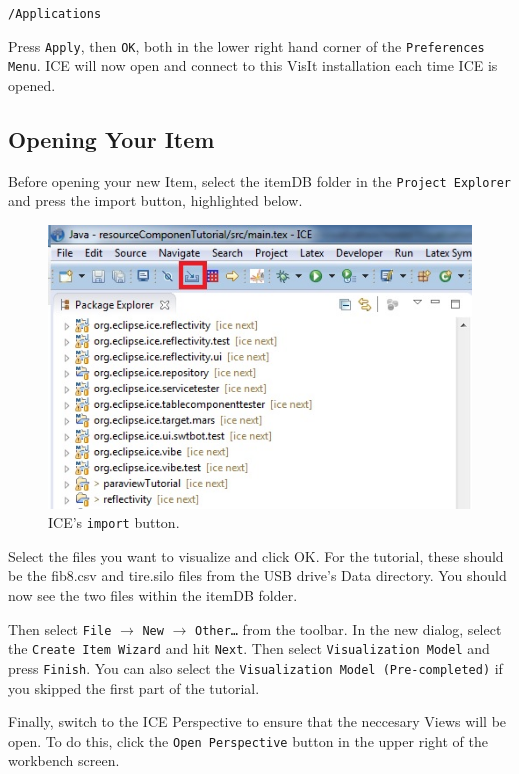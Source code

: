 \texttt{/Applications}

Press \texttt{Apply}, then \texttt{OK}, both in the lower right hand corner of
the \texttt{Preferences Menu}.
ICE will now open and connect to this VisIt installation each time ICE is opened.

\subsection{Opening Your Item}
Before opening your new Item, select the itemDB folder in the \texttt{Project
Explorer} and press the import button, highlighted below.

\begin{figure}[!h]
\includegraphics[width=12cm]{images/ImportButton}
\centering
\caption{ICE's \texttt{import} button.}
\label{fig:importbutton}
\end{figure}

Select the files you want to visualize and click OK. For the tutorial, these
should be the fib8.csv and tire.silo files from the USB drive's Data directory.
You should now see the two files within the itemDB folder.

Then select \texttt{File} $\rightarrow$ \texttt{New} $\rightarrow$
\texttt{Other\ldots} from the toolbar.
In the new dialog, select the \texttt{Create Item Wizard} and hit \texttt{Next}.
Then select \texttt{Visualization Model} and press \texttt{Finish}. You can also select the
\texttt{Visualization Model (Pre-completed)} if you skipped the first part of
the tutorial.

Finally, switch to the ICE Perspective to ensure that the neccesary Views will
be open. To do this, click the \texttt{Open Perspective} button in the upper right
of the workbench screen.

